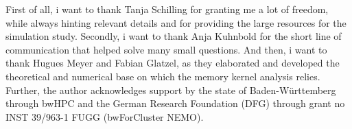 
\label{sec:acknowlegment}
First of all, i want to thank Tanja Schilling for granting me a lot of freedom, while always hinting relevant details and for providing the large resources for the simulation study. Secondly, i want to thank Anja Kuhnbold for the short line of communication that helped solve many small questions. And then, i want to thank Hugues Meyer and Fabian Glatzel, as they elaborated and developed the theoretical and numerical base on which the memory kernel analysis relies.\\

Further, the author acknowledges support by the state of Baden-Württemberg through bwHPC
and the German Research Foundation (DFG) through grant no INST 39/963-1 FUGG (bwForCluster NEMO).

